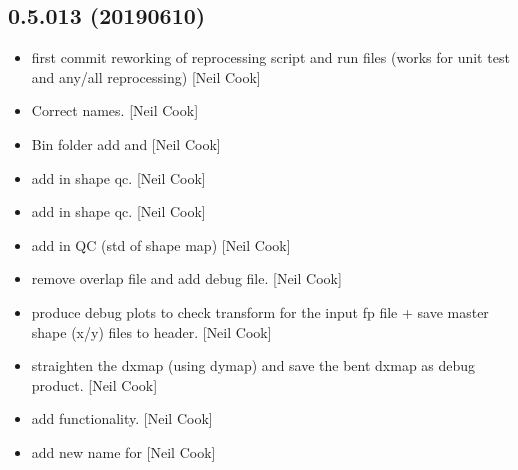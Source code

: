 \documentclass[a4paper,10pt,english]{report}
\begin{document}
\subsection{0.5.013 (2019\sphinxhyphen{}06\sphinxhyphen{}10)}
\label{\detokenize{misc/changelog:id142}}\begin{itemize}
\item {} 
 \sphinxhyphen{} first commit reworking of reprocessing script and
run files (works for unit test and any/all reprocessing) {[}Neil Cook{]}

\item {} 
Correct names. {[}Neil Cook{]}

\item {} 
Bin folder \sphinxhyphen{} add  and  {[}Neil Cook{]}

\item {} 
 \sphinxhyphen{} add in shape qc. {[}Neil Cook{]}

\item {} 
 \sphinxhyphen{} add in shape qc. {[}Neil Cook{]}

\item {} 
 \sphinxhyphen{} add in QC (std of shape map) {[}Neil Cook{]}

\item {} 
 \sphinxhyphen{} remove overlap file and add 
debug file. {[}Neil Cook{]}

\item {} 
 \sphinxhyphen{} produce debug plots to check transform for the
input fp file + save master shape (x/y) files to header. {[}Neil Cook{]}

\item {} 
 \sphinxhyphen{} straighten the dxmap (using dymap) and
save the bent dxmap as debug product. {[}Neil Cook{]}

\item {} 
 \sphinxhyphen{} add  functionality. {[}Neil Cook{]}

\item {} 
 \sphinxhyphen{} add new name for 
 {[}Neil Cook{]}


\end{itemize}
\end{document}
